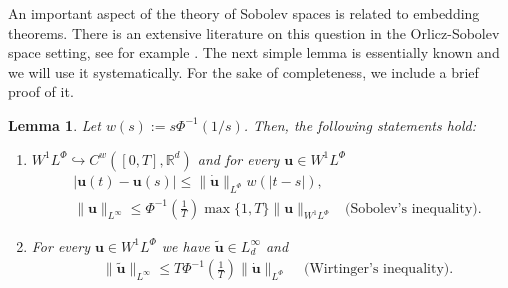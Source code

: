 \documentclass[twoside]{elsarticle}
\newtheorem{lem}[thm]{Lemma}
\theoremstyle{remark}
\newcommand{\orlnor}{\|_{L^{\Phi}}}
\newcommand{\lphi}{L^{\Phi}}
\newcommand{\wphi}{W^{1}\lphi}
\newcommand{\sobnor}{\|_{W^{1}\lphi}}
\renewcommand{\b}[1]{\boldsymbol{#1}}
\newcommand{\rr}{\mathbb{R}}
\renewcommand{\leq}{\leqslant}
\begin{document}
 An important aspect of the theory of Sobolev spaces is related to embedding theorems. There is an extensive literature on this question in the  Orlicz-Sobolev space setting, see for example
 \cite{cianchi2000fully,cianchi1999some,claverooptimal,edmunds2000optimal,kerman2006optimal}.
The next simple lemma is essentially known and we will use it systematically. For the sake of completeness, we include a brief proof of it.



\begin{lem}\label{inclusion orlicz} Let  $w(s):= s\Phi^{-1}(1/s)$. Then, the following statements hold:
\begin{enumerate}
\item\label{inclusion orlicz_item1} $\wphi\hookrightarrow C^w([0,T],\rr^d) $ and for every $\b{u}\in\wphi$
\begin{align}
 &\left|\b{u}(t)-\b{u}(s) \right| \leq  \|\b{\dot{u}}\orlnor w(| t-s|),&\label{in-sob-cont}
\\
& \|\b{u}\|_{L^{\infty}} \leq\Phi^{-1}\left(\frac{1}{T}\right)\max\{1,T\}\|\b{u}\sobnor&\text{(Sobolev's inequality).}\label{sobolev}
\end{align}
\item For every $\b{u}\in\wphi$ we have $\widetilde{\b{u}}\in L^{\infty}_d$ and 
\begin{align}
& \|\widetilde{\b{u}}\|_{L^{\infty}} \leq T\Phi^{-1}\left(\frac{1}{T}\right)\|\b{\dot u}\orlnor&\text{  (Wirtinger's inequality).}\label{wirtinger}
\end{align}




\end{enumerate}
\end{lem}
\end{document}
